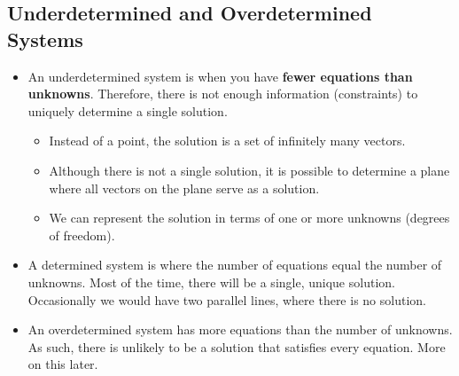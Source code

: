 \documentclass[10pt]{article}
\begin{document}
\subsection*{Underdetermined and Overdetermined Systems}
\begin{itemize}
    \item An underdetermined system is when you have \textbf{fewer equations than unknowns}.  Therefore, there is not enough information (constraints) to uniquely determine a single solution.
    \begin{itemize}
        \item Instead of a point, the solution is a set of infinitely many vectors.
        \item Although there is not a single solution, it is possible to determine a plane where all vectors on the plane serve as a solution.
        \item We can represent the solution in terms of one or more unknowns (degrees of freedom).
    \end{itemize}
    \item A determined system is where the number of equations equal the number of unknowns.  Most of the time, there will be a single, unique solution.  Occasionally we would have two parallel lines, where there is no solution.
    \item An overdetermined system has more equations than the number of unknowns.  As such, there is unlikely to be a solution that satisfies every equation.  More on this later.
\end{itemize}
\end{document}
